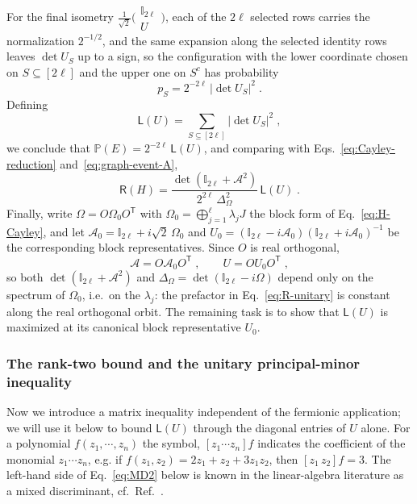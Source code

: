 \documentclass[prx,twocolumn,superscriptaddress,aps,10pt, frontmatterverbose, reprint,footinbib,longbibliography=true]{revtex4-2}
\newcommand{\trans}{\mathsf{T}}
\begin{document}
For the final isometry $\frac{1}{\sqrt2}\big(\begin{smallmatrix}\mathbb{I}_{2\ell}\\ U\end{smallmatrix}\big)$, each of the $2\ell$ selected rows carries the normalization $2^{-1/2}$, and the same expansion along the selected identity rows leaves $\det U_S$ up to a sign, so the configuration with the lower coordinate chosen on $S\subseteq[2\ell]$ and the upper one on $S^c$ has probability
\begin{equation}
    p_S=2^{-2\ell}\,|\det U_S|^2\;.
\end{equation}
Defining
\begin{equation}
    \mathsf{L}(U)=\sum_{S\subseteq[2\ell]}|\det U_S|^2\;,
    \label{eq:L-definition}
    \end{equation}
we conclude that $\mathbb{P}(E)=2^{-2\ell}\,\mathsf{L}(U)$, and comparing with Eqs.~\eqref{eq:Cayley-reduction} and~\eqref{eq:graph-event-A},
\begin{equation}
    \mathsf{R}(H)=\frac{\det(\mathbb{I}_{2\ell}+\mathcal{A}^2)}{2^{2\ell}\,\Delta_\Omega^2}\,\mathsf{L}(U)\;.
    \label{eq:R-unitary}
\end{equation}
Finally, write $\Omega=O\Omega_0O^{\trans}$ with $\Omega_0=\bigoplus_{j=1}^{\ell}\lambda_jJ$ the block form of Eq.~\eqref{eq:H-Cayley}, and let $\mathcal{A}_0=\mathbb{I}_{2\ell}+i\sqrt2\,\Omega_0$ and $U_0=(\mathbb{I}_{2\ell}-i\mathcal{A}_0)(\mathbb{I}_{2\ell}+i\mathcal{A}_0)^{-1}$ be the corresponding block representatives. Since $O$ is real orthogonal,
\begin{equation}
    \mathcal{A}=O\mathcal{A}_0O^{\trans}\;,\qquad U=OU_0O^{\trans}\;,
\end{equation}
so both $\det(\mathbb{I}_{2\ell}+\mathcal{A}^2)$ and $\Delta_\Omega=\det(\mathbb{I}_{2\ell}-i\Omega)$ depend only on the spectrum of $\Omega_0$, i.e.\ on the $\lambda_j$: the prefactor in Eq.~\eqref{eq:R-unitary} is constant along the real orthogonal orbit. The remaining task is to show that $\mathsf{L}(U)$ is maximized at its canonical block representative $U_0$.

\subsubsection{ The rank-two bound and the unitary principal-minor inequality}
\label{app:proof:MD2}

Now we introduce a matrix inequality independent of the fermionic application; we will use it below to bound $\mathsf{L}(U)$ through the diagonal entries of $U$ alone. 
For a polynomial $f(z_1, \cdots,z_n)$ the symbol, $[z_1\cdots z_n]f$ indicates the coefficient of the monomial $z_1\cdots z_n$, e.g. if $f(z_1,z_2)=2z_1+z_2+3 z_1z_2$, then $[z_1 \, z_2]f=3$.
The left-hand side of Eq.~\eqref{eq:MD2} below is known in the linear-algebra literature as a mixed discriminant, cf.\ Ref.~\cite{Bapat1989}.
\end{document}
